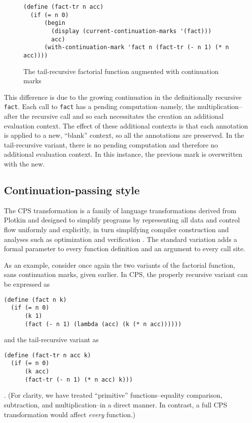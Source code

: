 \documentclass[11pt,ms]{byuprop}
\newcounter{definition}
\newcounter{example}
\begin{document}
\begin{figure}
\begin{verbatim}
(define (fact-tr n acc)
  (if (= n 0)
      (begin
        (display (current-continuation-marks '(fact)))
        acc)
      (with-continuation-mark 'fact n (fact-tr (- n 1) (* n acc))))
\end{verbatim}
\caption{The tail-recursive factorial function augmented with continuation marks}
\label{fac-tail-rec-cm}
\end{figure}

This difference is due to the growing continuation in the definitionally recursive
\texttt{fact}. Each call to \texttt{fact} has a pending computation--namely, the
multiplication--after the recursive call and so each necessitates the creation an
additional evaluation context. The effect of these additional contexts is that each
annotation is applied to a new, ``blank'' context, so all the annotations are preserved. 
In the tail-recursive variant, there is no pending computation and therefore no additional
evaluation context. In this instance, the previous mark is overwritten with the new.

\subsection{Continuation-passing style}

The CPS transformation is a family of language transformations derived from Plotkin \cite{plotkin1975call} and designed to simplify  programs by representing all data and control flow uniformly and explicitly, in turn simplifying compiler construction and analyses such as optimization and verification \cite{sabry1994formal}. The standard variation adds a formal parameter to every function definition and an argument to every call site.

As an example, consider once again the two variants of the factorial function, sans continuation 
marks, given earlier. In CPS, the properly recursive variant can be expressed as
\begin{verbatim}
(define (fact n k) 
  (if (= n 0)
      (k 1)
      (fact (- n 1) (lambda (acc) (k (* n acc))))))
\end{verbatim}
and the tail-recursive variant as
\begin{verbatim}
(define (fact-tr n acc k)
  (if (= n 0)
      (k acc)
      (fact-tr (- n 1) (* n acc) k)))
\end{verbatim}. (For clarity, we have treated ``primitive'' functions--equality 
comparison, subtraction, and multiplication--in a direct manner. In contrast, a 
full CPS transformation would affect \emph{every} function.)
\end{document}
